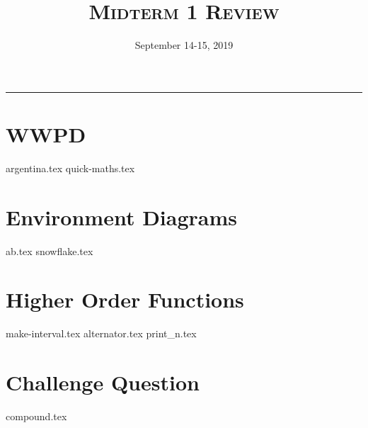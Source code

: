 \documentclass{exam}
\title{\textsc{Midterm 1 Review}}
\date{September 14-15, 2019}
\begin{document}
\maketitle
\rule{\textwidth}{0.15em}
\fontsize{12}{15}\selectfont


\section{WWPD}
\begin{questions}
{argentina.tex}
{quick-maths.tex}

\end{questions}

\newpage
\section{Environment Diagrams}
\begin{questions}
{ab.tex}
\newpage
{snowflake.tex}

\end{questions}

\newpage
\section{Higher Order Functions}
\begin{questions}
{make-interval.tex}
{alternator.tex}
{print_n.tex}

\end{questions}


\section{Challenge Question}
\begin{questions}
{compound.tex}
\end{questions}
\end{document}
